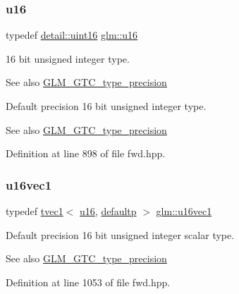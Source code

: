 \subsubsection{\texorpdfstring{u16}{u16}}
{\footnotesize\ttfamily typedef \mbox{\hyperlink{namespaceglm_1_1detail_a47b2a7d006d187338e8031a352d1ce56}{detail\+::uint16}} \mbox{\hyperlink{group__gtc__type__precision_gae7a1571503f83d2264ddfa705a6b082a}{glm\+::u16}}}

16 bit unsigned integer type. \begin{DoxySeeAlso}{See also}
\mbox{\hyperlink{group__gtc__type__precision}{G\+L\+M\+\_\+\+G\+T\+C\+\_\+type\+\_\+precision}}
\end{DoxySeeAlso}
Default precision 16 bit unsigned integer type. \begin{DoxySeeAlso}{See also}
\mbox{\hyperlink{group__gtc__type__precision}{G\+L\+M\+\_\+\+G\+T\+C\+\_\+type\+\_\+precision}} 
\end{DoxySeeAlso}


Definition at line 898 of file fwd.\+hpp.

\mbox{\label{group__gtc__type__precision_ga809cb55e5fed3456686aae96e7e8684c}} 
\subsubsection{\texorpdfstring{u16vec1}{u16vec1}}
{\footnotesize\ttfamily typedef \mbox{\hyperlink{structglm_1_1tvec1}{tvec1}}$<$ \mbox{\hyperlink{group__gtc__type__precision_gae7a1571503f83d2264ddfa705a6b082a}{u16}}, \mbox{\hyperlink{namespaceglm_a0f04f086094c747d227af4425893f545a9d21ccd8b5a009ec7eb7677befc3bf51}{defaultp}} $>$ \mbox{\hyperlink{group__gtc__type__precision_ga809cb55e5fed3456686aae96e7e8684c}{glm\+::u16vec1}}}

Default precision 16 bit unsigned integer scalar type. \begin{DoxySeeAlso}{See also}
\mbox{\hyperlink{group__gtc__type__precision}{G\+L\+M\+\_\+\+G\+T\+C\+\_\+type\+\_\+precision}} 
\end{DoxySeeAlso}


Definition at line 1053 of file fwd.\+hpp.

\mbox{\label{group__gtc__type__precision_ga10e8900b9610f930772aa55aee8e3121}} 
